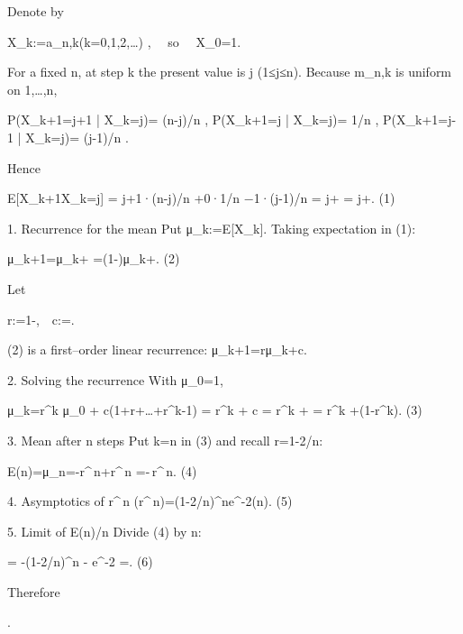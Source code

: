 Denote by  

X_k:=a_{n,k}\qquad(k=0,1,2,\dots ) ,  so  X_0=1.  

For a fixed n, at step k the present value is j (1≤j≤n).  
Because m_{n,k} is uniform on {1,…,n},

P(X_{k+1}=j+1 | X_k=j)= (n-j)/n ,  
P(X_{k+1}=j   | X_k=j)= 1/n         ,  
P(X_{k+1}=j-1 | X_k=j)= (j-1)/n .

Hence

E[X_{k+1}\mid X_k=j]
 = j+1·(n-j)/n +0·1/n −1·(j-1)/n
 = j+
 = j+.                           (1)

1.  Recurrence for the mean  
Put μ_k:=E[X_k].  Taking expectation in (1):

μ_{k+1}=μ_k+
       =\Bigl(1-\Bigr)μ_k+.        (2)

Let  

r:=1-, c:=.

(2) is a first–order linear recurrence: μ_{k+1}=rμ_k+c.

2.  Solving the recurrence  
With μ_0=1,

μ_k=r^k μ_0 + c(1+r+\dots+r^{k-1})
    = r^k + c
    = r^k +
    = r^k +(1-r^{k}).                      (3)

3.  Mean after n steps  
Put k=n in (3) and recall r=1-2/n:

E(n)=μ_n=-r^{\,n}+r^{\,n}
     =-\,r^{\,n}.             (4)

4.  Asymptotics of r^{\,n}  
(r^{\,n})=(1-2/n)^{n}\longrightarrow e^{-2}\qquad(n\to\infty).      (5)

5.  Limit of E(n)/n  
Divide (4) by n:

= -(1-2/n)^{n}
             \xrightarrow[n\to\infty]{} - e^{-2}
             =.                       (6)

Therefore  

.